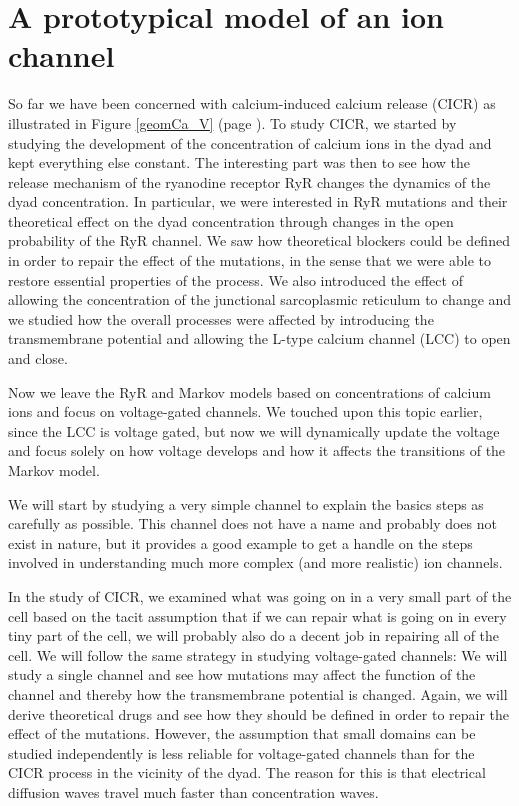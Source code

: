 
\chapter{A prototypical model of an ion channel}
\label{prototype}

So far we have been concerned with calcium-induced calcium release (CICR) as
illustrated in Figure \ref{geomCa_V} (page \pageref{geomCa_V}). To
study CICR, we started by studying the development of the concentration of
calcium ions in the dyad and kept everything else constant. The interesting
part was then to see how the release mechanism of the ryanodine receptor RyR changes 
the dynamics of the dyad concentration. In particular, we were interested in RyR 
mutations and their theoretical effect on the dyad concentration through changes in the
open probability of the RyR channel. We saw how theoretical blockers could be
defined in order to repair the effect of the mutations, in the sense that we
were able to restore essential properties of the process. We also introduced the
effect of allowing the concentration of the junctional sarcoplasmic reticulum 
 to change and we studied how the overall processes were affected by introducing 
 the transmembrane potential and allowing the L-type calcium channel (LCC) to open and close. 

Now we leave the RyR and Markov
models based on concentrations of calcium ions and focus on
voltage-gated channels. We touched upon this topic earlier, since the LCC
is voltage gated, but now we will dynamically update the voltage and focus
solely on how voltage develops and how it affects the transitions of the
Markov model.

We will start by studying a very simple channel to explain
the basics steps as carefully as possible. This channel does not have a name and
probably does not exist in nature, but it provides a good example to
get a handle on the steps involved in understanding much more complex (and more
realistic) ion channels. 

In the study of CICR, we examined what was going on in a very small part of the 
cell based on the tacit assumption that if we can repair what is going on in 
every tiny part of the cell, we will probably also do a decent job in repairing all of the cell. We will follow the same strategy in studying voltage-gated channels: We will study a single channel and see how mutations may affect the 
function of the channel and thereby how the transmembrane potential is changed. Again, we will derive 
theoretical drugs and see how they should be defined in order to repair the effect of the mutations. However, the assumption that small domains can be studied independently is less reliable for voltage-gated channels than for 
the CICR process in the vicinity of the dyad. The reason for this is that electrical diffusion waves travel much faster than concentration waves. %

